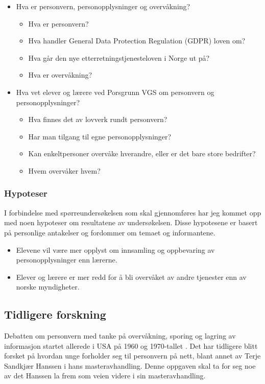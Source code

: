 \begin{itemize}
    \item Hva er personvern, personopplysninger og overvåkning?
    \begin{itemize}
        \item Hva er personvern?
        \item Hva handler General Data Protection Regulation (GDPR) loven om?
        \item Hva går den nye etterretningstjenesteloven i Norge ut på?
        \item Hva er overvåkning?
    \end{itemize}
    \item Hva vet elever og lærere ved Porsgrunn VGS om personvern og personopplysninger?
    \begin{itemize}
        \item Hva finnes det av lovverk rundt personvern?
        \item Har man tilgang til egne personopplysninger?
        \item Kan enkeltpersoner overvåke hverandre, eller er det bare store bedrifter? 
        \item Hvem overvåker hvem?
    \end{itemize}
\end{itemize}

\subsubsection{Hypoteser}\label{subsubsec:hypoteser}
I forbindelse med spørreundersøkelsen som skal gjennomføres har jeg kommet opp med noen hypoteser om resultatene av undersøkelsen. Disse hypotesene er basert på personlige antakelser og fordommer om temaet og informantene.

\begin{itemize}
    \item Elevene vil være mer opplyst om innsamling og oppbevaring av personopplysninger enn lærerne.
    \item Elever og lærere er mer redd for å bli overvåket av andre tjenester enn av norske myndigheter.
\end{itemize}

\subsection{Tidligere forskning}
Debatten om personvern med tanke på overvåkning, sporing og lagring av informasjon startet allerede i USA på 1960 og 1970-tallet \parencite[36]{bok:nissenbaum}. Det har tidligere blitt forsket på hvordan unge forholder seg til personvern på nett, blant annet av Terje Sandkjær Hanssen i hans masteravhandling. Denne oppgaven skal ta for seg noe av det Hanssen la frem som veien videre i sin masteravhandling. \parencite{master:hanssen}

